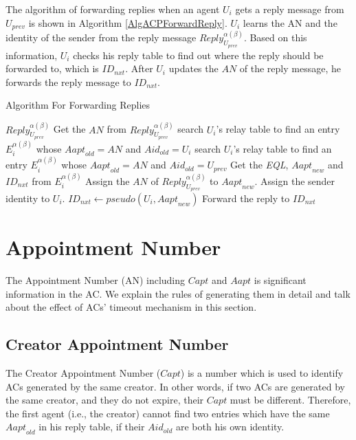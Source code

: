 The algorithm of forwarding replies when an agent $U_i$ gets a reply message from $U_{prev}$ is shown in Algorithm \ref{AlgACPForwardReply}. $U_i$ learns the AN and the identity of the sender from the reply message ${Reply}_{U_{prev}}^{\alpha\left(\beta\right)}$. Based on this information, $U_i$ checks his reply table to find out where the reply should be forwarded to, which is ${ID}_{nxt}$. After $U_i$ updates the $AN$ of the reply message, he forwards the reply message to ${ID}_{nxt}$.

\begin{algorithm} [hbtp]
\caption{Algorithm For Forwarding Replies}\label{AlgACPForwardReply}
\begin{algorithmic}[1]
 {${Reply}_{U_{prev}}^{\alpha\left(\beta\right)}$}
\State Get the $AN$ from ${Reply}_{U_{prev}}^{\alpha\left(\beta\right)}$
	\State search $U_i$’s relay table to find an entry $E_i^{\alpha\left(\beta\right)}$
	\State whose ${Aapt}_{old}=AN$ and ${Aid}_{old}=U_i$
\Else
	\State search $U_i$’s relay table to find an entry $E_i^{\alpha\left(\beta\right)}$
	\State whose ${Aapt}_{old}=AN$ and ${Aid}_{old}=U_{prev}$	
\EndIf
\State Get the \textit{EQL}, ${Aapt}_{new}$ and ${ID}_{nxt}$ from $E_i^{\alpha\left(\beta\right)}$
\State Assign the $AN$ of ${Reply}_{U_{prev}}^{\alpha\left(\beta\right)}$ to ${Aapt}_{new}$.
\State Assign the sender identity to $U_i$.
	\State ${ID}_{nxt}\gets pseudo\left(U_i,{Aapt}_{new}\right)$
\EndIf
\State Forward the reply to ${ID}_{nxt}$
\EndProcedure

\end{algorithmic}
\end{algorithm}

\section{ Appointment Number}

\noindent The Appointment Number (AN) including $Capt$ and $Aapt$ is significant information in the AC. We explain the rules of generating them in detail and talk about the effect of ACs' timeout mechanism in this section.


\subsection{  Creator Appointment Number}

\noindent The Creator Appointment Number ($Capt$) is a number which is used to identify ACs generated by the same creator. In other words, if two ACs are generated by the same creator, and they do not expire, their $Capt$ must be different. Therefore, the first agent (i.e., the creator) cannot find two entries which have the same ${Aapt}_{old}$ in his reply table, if their ${Aid}_{old}$ are both his own identity.


